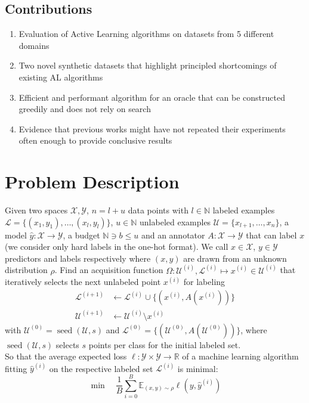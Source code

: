 \documentclass[]{article}
\newcommand{\X}{\mathcal{X}}
\newcommand{\Y}{\mathcal{Y}}
\newcommand{\U}{\mathcal{U}}
\newcommand{\LL}{\mathcal{L}}
\begin{document}
\subsection*{Contributions}
\begin{enumerate}
	\item Evaluation of Active Learning algorithms on datasets from 5 different domains
	\item Two novel synthetic datasets that highlight principled shortcomings of existing AL algorithms
	\item Efficient and performant algorithm for an oracle that can be constructed greedily and does not rely on search
        \item Evidence that previous works might have not repeated their experiments often enough to provide conclusive results
\end{enumerate}


\section{Problem Description}
Given two spaces $\X, \Y$, $n=l+u$ data points with $l \in \mathbb{N}$ labeled examples $\mathcal{L} = \{(x_1, y_1),\ldots, (x_l,y_l)\}$, $u \in \mathbb{N}$ unlabeled examples $\mathcal{U} = \{x_{l+1},\ldots,x_{n}\}$, a model $\hat y: \X \to \Y$, a budget $\mathbb{N} \ni b \le u$ and an annotator $A: \mathcal{X} \to \mathcal{Y}$ that can label $x$ (we consider only hard labels in the one-hot format). 
We call $x \in \mathcal{X}$, $y \in \mathcal{Y}$ predictors and labels respectively where $(x,y)$ are drawn from an unknown distribution $\rho$. 
Find an acquisition function $\Omega: \U^{(i)},\LL^{(i)} \mapsto x^{(i)} \in \U^{(i)}$ that iteratively selects the next unlabeled point $x^{(i)}$ for labeling
\begin{align*}
	\LL^{(i+1)} &\gets \LL^{(i)} \cup \{\left(x^{(i)}, A(x^{(i)})\right)\} \\
	\U^{(i+1)} &\gets \U^{(i)} \setminus x^{(i)} %
\end{align*}
with $\U^{(0)} = \operatorname{seed}(\U, s)$ and $\LL^{(0)} = \{\left(\U^{(0)}, A(\U^{(0)})\right)\}$, where $\operatorname{seed}(\U, s)$ selects $s$ points per class for the initial labeled set. \\
So that the average expected loss $\ell: \mathcal{Y} \times \mathcal{Y} \to \mathbb{R}$ of a machine learning algorithm fitting $\hat y^{(i)}$ on the respective labeled set $\LL^{(i)}$ is minimal: 
$$\min \quad \frac{1}{B} \sum\limits_{i=0}^B \mathbb{E}_{(x,y) \sim \rho} \ell(y, \hat y^{(i)})$$
\end{document}
